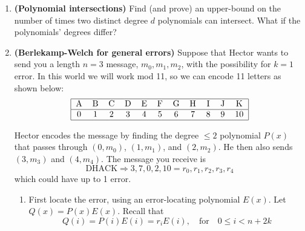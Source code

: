 \documentclass[11pt]{article}
\newif\ifsolutions
\begin{document}
\maketitle

\begin{enumerate}

% 
\item {\bf (Polynomial intersections)} Find (and prove) an upper-bound on the number of times two distinct degree $d$ polynomials can intersect. What if the polynomials' degrees differ?

\vspace{20mm}

\ifsolutions
\vspace{-20mm}
{\color{blue}{
\textbf{Solutions:} They can intersect up to $d$ times. This is because we can specify $d$ points to be the same for both polynomials, then the $(d+1)$th point to be different.  Then the polynomials will be distinct, but still agree at $d$ points.  If $d+1$ points agree, the polynomials will be identical.

If the polynomials have degrees $d_1$ and $d_2$, with $d_1 > d_2$, then they can intersect up to $d_1$ times. Pick $d_1$ points on the polynomial of degree $d_2$, and another point not on this polynomial. Then a unique degree $d_1$ polynomial will go through these $d_1+1$ points.}}
\fi


\item {\bf (Berlekamp-Welch for general errors)} Suppose that Hector wants to send you a length $n=3$ message, $m_0,m_1,m_2$, with the possibility for $k=1$ error. In this world we will work mod 11, so we can encode 11 letters as shown below:
\[ \begin{tabular}{|ccccccccccc|}
\hline
A & B & C & D & E & F & G & H & I & J & K \\
\hline
0 & 1 & 2 & 3 & 4 & 5 & 6 & 7& 8 & 9 & 10 \\
\hline
\end{tabular} \]

Hector encodes the message by finding the degree $\leq 2$ polynomial $P(x)$ that passes through $(0,m_0)$, $(1,m_1)$, and $(2,m_2)$. He then also sends $(3,m_3)$ and $(4,m_4)$. The message you receive is 
\[ \text{DHACK} \Rightarrow 3,7,0,2,10 = r_0,r_1,r_2,r_3,r_4 \]
which could have up to 1 error.

\begin{enumerate}
\item First locate the error, using an error-locating polynomial $E(x)$.  Let $Q(x) = P(x)E(x)$. Recall that
\[ Q(i) = P(i)E(i) = r_i E(i), \quad \text{for} \quad 0 \leq i < n+2k \]


\end{enumerate}
\end{enumerate}
\end{document}
